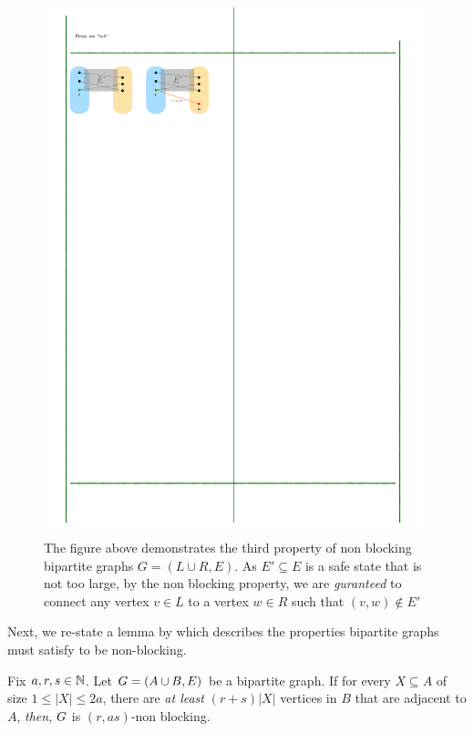 \documentclass[11pt]{article}
\begin{document}
\begin{figure}[h]
\center
{\caption{The figure above demonstrates the third property of non blocking bipartite graphs $G=(L\cup R, E)$. As $E' \subseteq E$ is a safe state that is not too large, by the non blocking property, we are \emph{guranteed} to connect any vertex $v \in L$ to a vertex $w \in R$ such that $(v,w) \notin E'$}
}
\label{fig:test}
{\includegraphics{assets/non-blocking-networks.pdf}}
\end{figure}

Next, we re-state a lemma by \citep[Proposition 1]{feldman1988wide} which describes the properties bipartite graphs must satisfy to be non-blocking.

\begin{lemma}\label{lemma:condtions-for-non-block}
Fix $a, r, s \in \mathbb{N}$. Let $G = (A \cup B, E)$ be a bipartite graph.
If for every $X \subseteq A$ of size $1 \leq |X| \leq 2a$, there are \emph{at least} $(r + s)|X|$ vertices in $B$ that are adjacent to $A$, \emph{then}, $G$ is $(r, as)$-non blocking.
\end{lemma}
\end{document}
